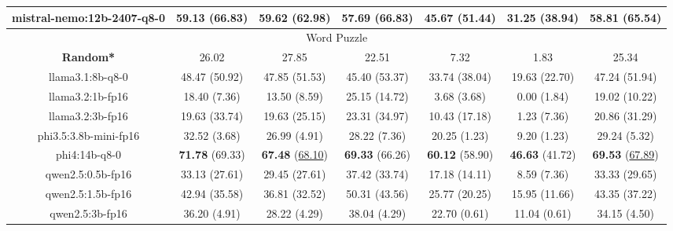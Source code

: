 \begin{table}[hbp]
{\begin{tabular}{ccccccc}
        \multicolumn{1}{c|}{mistral-nemo:12b-2407-q8-0} & 59.13 (66.83) & 59.62 (62.98) & \multicolumn{1}{c|}{57.69 (66.83)} & 45.67 (51.44) & \multicolumn{1}{c|}{31.25 (38.94)} & 58.81 (65.54) \\
        
\hline
\multicolumn{7}{c}{Word Puzzle} \\ \hline
\multicolumn{1}{c|}{\textbf{Random*}} & 26.02 & 27.85 & \multicolumn{1}{c|}{22.51} & 7.32 & \multicolumn{1}{c|}{1.83} & 25.34 \\ \hline

        \multicolumn{1}{c|}{llama3.1:8b-q8-0} & 48.47 (50.92) & 47.85 (51.53) & \multicolumn{1}{c|}{45.40 (53.37)} & 33.74 (38.04) & \multicolumn{1}{c|}{19.63 (22.70)} & 47.24 (51.94) \\
        

        \multicolumn{1}{c|}{llama3.2:1b-fp16} & 18.40 (7.36) & 13.50 (8.59) & \multicolumn{1}{c|}{25.15 (14.72)} & 3.68 (3.68) & \multicolumn{1}{c|}{0.00 (1.84)} & 19.02 (10.22) \\
        

        \multicolumn{1}{c|}{llama3.2:3b-fp16} & 19.63 (33.74) & 19.63 (25.15) & \multicolumn{1}{c|}{23.31 (34.97)} & 10.43 (17.18) & \multicolumn{1}{c|}{1.23 (7.36)} & 20.86 (31.29) \\
        

        \multicolumn{1}{c|}{phi3.5:3.8b-mini-fp16} & 32.52 (3.68) & 26.99 (4.91) & \multicolumn{1}{c|}{28.22 (7.36)} & 20.25 (1.23) & \multicolumn{1}{c|}{9.20 (1.23)} & 29.24 (5.32) \\
        

        \multicolumn{1}{c|}{phi4:14b-q8-0} & \textbf{71.78} (69.33) & \textbf{67.48} (\underline{68.10}) & \multicolumn{1}{c|}{\textbf{69.33} (66.26)} & \textbf{60.12} (58.90) & \multicolumn{1}{c|}{\textbf{46.63} (41.72)} & \textbf{69.53} (\underline{67.89}) \\
        

        \multicolumn{1}{c|}{qwen2.5:0.5b-fp16} & 33.13 (27.61) & 29.45 (27.61) & \multicolumn{1}{c|}{37.42 (33.74)} & 17.18 (14.11) & \multicolumn{1}{c|}{8.59 (7.36)} & 33.33 (29.65) \\
        

        \multicolumn{1}{c|}{qwen2.5:1.5b-fp16} & 42.94 (35.58) & 36.81 (32.52) & \multicolumn{1}{c|}{50.31 (43.56)} & 25.77 (20.25) & \multicolumn{1}{c|}{15.95 (11.66)} & 43.35 (37.22) \\
        

        \multicolumn{1}{c|}{qwen2.5:3b-fp16} & 36.20 (4.91) & 28.22 (4.29) & \multicolumn{1}{c|}{38.04 (4.29)} & 22.70 (0.61) & \multicolumn{1}{c|}{11.04 (0.61)} & 34.15 (4.50) \\
        


\end{tabular}}
\end{table}
